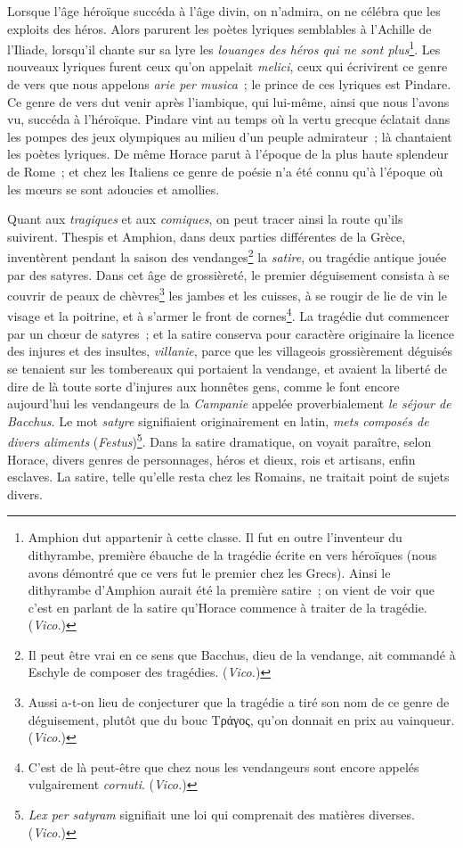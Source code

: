 \documentclass[french,twoside]{book} %
\begin{document}
Lorsque l’âge héroïque succéda à l’âge divin, on n’admira, on ne célébra que les exploits des héros. Alors parurent les poètes lyriques semblables à l’Achille de l’Iliade, lorsqu’il chante sur sa lyre les {\itshape louanges des héros qui ne sont plus}\footnote{Amphion dut appartenir à cette classe. Il fut en outre l’inventeur du dithyrambe, première ébauche de la tragédie écrite en vers héroïques (nous avons démontré que ce vers fut le premier chez les Grecs). Ainsi le dithyrambe d’Amphion aurait été la première satire ; on vient de voir que c’est en parlant de la satire qu’Horace commence à traiter de la tragédie. ({\itshape Vico.})}. Les nouveaux lyriques furent ceux qu’on appelait {\itshape melici}, ceux qui écrivirent ce genre de vers que nous appelons {\itshape arie per musica} ; le prince de ces lyriques est Pindare. Ce genre de vers dut venir après l’iambique, qui lui-même, ainsi que nous l’avons vu, succéda à l’héroïque. Pindare vint au temps où la vertu grecque éclatait dans les pompes des jeux olympiques au milieu d’un peuple admirateur ; là chantaient les poètes lyriques. De même Horace parut à l’époque de la plus haute splendeur de Rome ; et chez les Italiens ce genre de poésie n’a été connu qu’à l’époque où les mœurs se sont adoucies et amollies.\par
Quant aux {\itshape tragiques} et aux {\itshape comiques}, on peut tracer ainsi la route qu’ils suivirent. Thespis et Amphion, dans deux parties différentes de la Grèce, inventèrent pendant la saison des vendanges\footnote{Il peut être vrai en ce sens que Bacchus, dieu de la vendange, ait commandé à Eschyle de composer des tragédies. ({\itshape Vico.})} la {\itshape satire}, ou tragédie antique jouée par des satyres. Dans cet âge de grossièreté, le premier déguisement consista à se couvrir de peaux de chèvres\footnote{Aussi a-t-on lieu de conjecturer que la tragédie a tiré son nom de ce genre de déguisement, plutôt que du bouc Τράγος, qu’on donnait en prix au vainqueur. ({\itshape Vico.})} les jambes et les cuisses, à se rougir de lie de vin le visage et la poitrine, et à s’armer le front de cornes\footnote{C’est de là peut-être que chez nous les vendangeurs sont encore appelés vulgairement {\itshape cornuti}. ({\itshape Vico.})}. La tragédie dut commencer par un chœur de satyres ; et la satire conserva pour caractère originaire la licence des injures et des insultes, {\itshape villanie}, parce que les villageois grossièrement déguisés se tenaient sur les tombereaux qui portaient la vendange, et  avaient la liberté de dire de là toute sorte d’injures aux honnêtes gens, comme le font encore aujourd’hui les vendangeurs de la {\itshape Campanie} appelée proverbialement {\itshape le séjour de Bacchus}. Le mot {\itshape satyre} signifiaient originairement en latin, \emph{{\itshape mets composés de divers aliments}} ({\itshape Festus})\footnote{{\itshape Lex per satyram} signifiait une loi qui comprenait des matières diverses. ({\itshape Vico.})}. Dans la satire dramatique, on voyait paraître, selon Horace, divers genres de personnages, héros et dieux, rois et artisans, enfin esclaves. La satire, telle qu’elle resta chez les Romains, ne traitait point de sujets divers.\par
\end{document}
